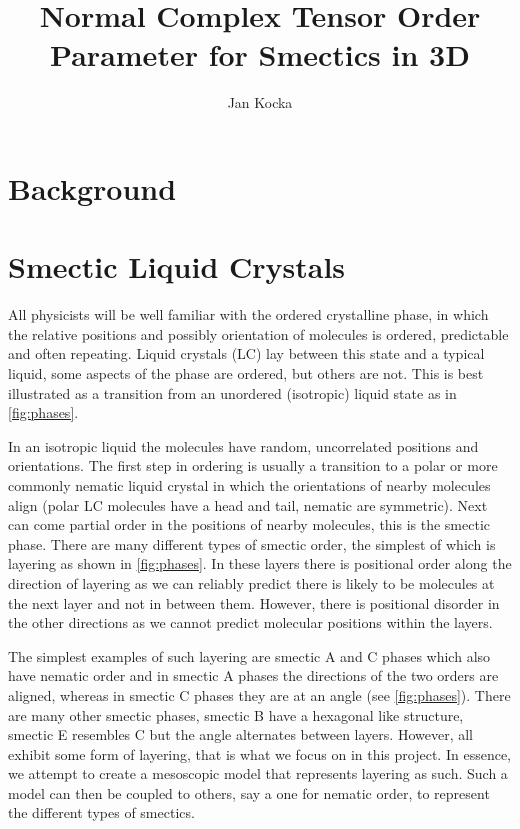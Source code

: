 \documentclass[12pt]{article}
\begin{document}
\title{Normal Complex Tensor Order Parameter for Smectics in 3D}
\author{Jan Kocka}

\begin{abstract}
    \lipsum[10]
\end{abstract}

\maketitle

\personalstatement
\acknowledgments

\maintext

\section{Background}
\section{Smectic Liquid Crystals}
All physicists will be well familiar with the ordered crystalline phase, in which the relative positions and possibly orientation of molecules is ordered, predictable and often repeating.
Liquid crystals (LC) lay between this state and a typical liquid, some aspects of the phase are ordered, but others are not.
This is best illustrated as a transition from an unordered (isotropic) liquid state as in \cref{fig:phases}.

In an isotropic liquid the molecules have random, uncorrelated positions and orientations.
The first step in ordering is usually a transition to a polar or more commonly nematic liquid crystal in which the orientations of nearby molecules align (polar LC molecules have a head and tail, nematic are symmetric).
Next can come partial order in the positions of nearby molecules, this is the smectic phase.
There are many different types of smectic order, the simplest of which is layering as shown in \cref{fig:phases}.
In these layers there is positional order along the direction of layering as we can reliably predict there is likely to be molecules at the next layer and not in between them.
However, there is positional disorder in the other directions as we cannot predict molecular positions within the layers.

The simplest examples of such layering are smectic A and C phases which also have nematic order and in smectic A phases the directions of the two orders are aligned, whereas in smectic C phases they are at an angle (see \cref{fig:phases}).
There are many other smectic phases, smectic B have a hexagonal like structure, smectic E resembles C but the angle alternates between layers.
However, all exhibit some form of layering, that is what we focus on in this project.
In essence, we attempt to create a mesoscopic model that represents layering as such.
Such a model can then be coupled to others, say a one for nematic order, to represent the different types of smectics.
\end{document}
